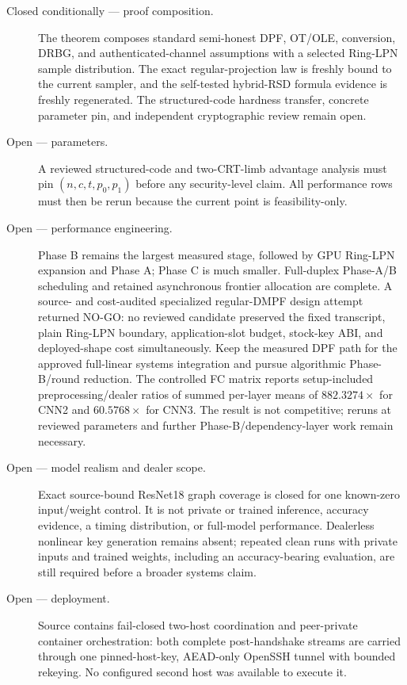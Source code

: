 \documentclass[11pt]{article}
\begin{document}
\begin{description}
\item[Closed conditionally --- proof composition.] The theorem composes
  standard semi-honest DPF, OT/OLE, conversion, DRBG, and authenticated-channel
assumptions with a selected Ring-LPN sample distribution. The exact
regular-projection law is freshly bound to the current sampler, and the
self-tested hybrid-RSD formula evidence is freshly regenerated. The
structured-code hardness transfer, concrete parameter pin, and independent
cryptographic review remain open.
\item[Open --- parameters.] A reviewed structured-code and two-CRT-limb
  advantage analysis must pin $(n,c,t,p_0,p_1)$ before any security-level
  claim. All performance rows must then be rerun because the current point is
  feasibility-only.
\item[Open --- performance engineering.] Phase B remains the largest measured
  stage, followed by GPU Ring-LPN expansion and Phase A; Phase C is much
  smaller. Full-duplex Phase-A/B scheduling and retained asynchronous frontier
  allocation are complete. A source- and cost-audited specialized regular-DMPF
  design attempt returned NO-GO: no reviewed candidate preserved the fixed
  transcript, plain Ring-LPN boundary, application-slot budget, stock-key ABI,
  and deployed-shape cost simultaneously. Keep the measured DPF path for the
  approved full-linear systems integration and pursue algorithmic Phase-B/round
  reduction. The controlled FC matrix reports setup-included
  preprocessing/dealer ratios of summed per-layer means of $882.3274\times$
  for CNN2 and $60.5768\times$ for CNN3. The result is not competitive;
  reruns at reviewed parameters and further Phase-B/dependency-layer work
  remain necessary.
\item[Open --- model realism and dealer scope.] Exact source-bound ResNet18
  graph coverage is closed for one known-zero input/weight control. It is not
  private or trained inference, accuracy evidence, a timing distribution, or
  full-model performance. Dealerless nonlinear key generation remains absent;
  repeated clean runs with private inputs and trained weights, including an
  accuracy-bearing evaluation, are still required before a broader systems
  claim.
\item[Open --- deployment.] Source contains fail-closed two-host coordination
  and peer-private container orchestration: both complete post-handshake
  streams are carried through one pinned-host-key, AEAD-only OpenSSH tunnel
  with bounded rekeying. No configured second host was available to execute it.

\end{description}
\end{document}
